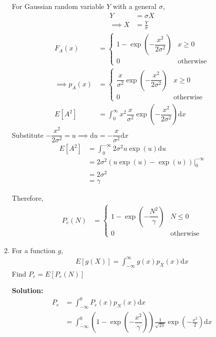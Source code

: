 \documentclass[journal,12pt,twocolumn]{IEEEtran}
\newcommand{\solution}{\noindent \textbf{Solution: }}
\providecommand{\brak}[1]{\ensuremath{\left(#1\right)}}
\providecommand{\sbrak}[1]{\ensuremath{\left[#1\right]}}
\providecommand{\mean}[1]{E\left[ #1 \right]}
\providecommand{\der}[1]{\mathrm{d} #1}
\numberwithin{equation}{section}
\renewcommand\thesection{\arabic{section}}
\begin{document}
\begin{enumerate}[label=\thesection.\arabic*,ref=\thesection.\theenumi]
	For Gaussian random variable $Y$ with a general $\sigma$,
	\begin{align}
		Y &= \sigma X \\
		\implies X &= \frac{Y}{\sigma} 
	\end{align}
	\begin{align}
		F_A(x) &= 
		\begin{cases}
			1 - \exp\brak{-\dfrac{x^2}{2\sigma^2}} & x \geq 0 \\
			0 & \text{otherwise}
		\end{cases} \\
		\implies p_A(x) &=
		\begin{cases}
			\dfrac{x}{\sigma^2}\exp\brak{-\dfrac{x^2}{2\sigma^2}} & x \geq 0 \\
			0 & \text{otherwise}
		\end{cases} \\
		\mean{A^2} &= \int_0^{\infty} x^2 \dfrac{x}{\sigma^2}\exp\brak{-\dfrac{x^2}{2\sigma^2}} \der{x}
	\end{align}
	Substitute $-\dfrac{x^2}{2\sigma^2} = u \implies \der{u} = -\dfrac{x}{\sigma^2} \der{x}$ 
	\begin{align}
		\mean{A^2} &= \int_0^{-\infty} 2\sigma^2u \exp(u) \der{u} \\
		&= 2\sigma^2 \left.\brak{u\exp(u) - \exp(u)}\right|_0^{-\infty} \\
		&= 2\sigma^2 \\
		&= \gamma
	\end{align}
	
	Therefore,
	\begin{align}
		P_e(N) &= 
		\begin{cases}
			1 - \exp\brak{-\dfrac{N^2}{\gamma}} & N \leq 0 \\
			0 & \text{otherwise}
		\end{cases}
	\end{align}
	
	\item For a function $g$,
	\begin{align}
		E\sbrak{g(X)} = \int_{-\infty}^{\infty}g(x)p_{X}(x) \der{x}
	\end{align}
	Find $P_e = E\sbrak{P_e(N)}$
	
	\solution 
	\begin{align}
		P_e &= \int_{-\infty}^{0} P_e(x) p_{N}(x) \der{x} \\
		&= \int_{-\infty}^{0} \brak{1 - \exp\brak{-\dfrac{x^2}{\gamma}}} \frac{1}{\sqrt{2\pi}} \exp\brak{-\frac{x^2}{2}} \der{x} 
	\end{align}
	

\end{enumerate}
\end{document}
